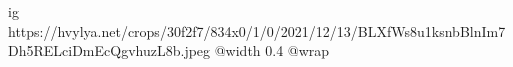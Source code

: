  
 
 
 
 

\ifcmt
  ig https://hvylya.net/crops/30f2f7/834x0/1/0/2021/12/13/BLXfWs8u1ksnbBlnIm7Dh5RELciDmEcQgvhuzL8b.jpeg
  @width 0.4
  @wrap 
\fi
